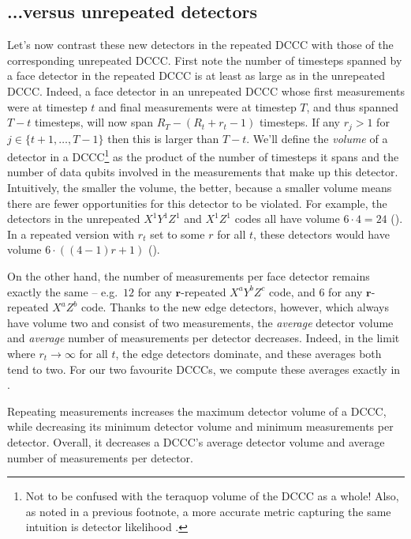 \subsection{...versus unrepeated detectors}\label{subsubsec:repeating_measurements_volume_measurements_detectors}

Let's now contrast these new detectors in the repeated DCCC with those of the corresponding unrepeated DCCC.
First note the number of timesteps spanned by a face detector in the repeated DCCC is at least as large as in the unrepeated DCCC.
Indeed, a face detector in an unrepeated DCCC whose first measurements were at timestep $t$ and final measurements were at timestep $T$, and thus spanned $T - t$ timesteps, will now span $R_T - (R_t + r_t - 1)$ timesteps.
If any $r_j > 1$ for $j \in \{t+1, \ldots, T-1\}$ then this is larger than $T-t$.
We'll define the \textit{volume} of a detector in a DCCC\footnote{Not to be confused with the teraquop volume of the DCCC as a whole! Also, as noted in a previous footnote, a more accurate metric capturing the same intuition is detector likelihood \cite{hesner2024using}.} as the product of the number of timesteps it spans and the number of data qubits involved in the measurements that make up this detector.
Intuitively, the smaller the volume, the better, because a smaller volume means there are fewer opportunities for this detector to be violated.
For example, the detectors in the unrepeated $X^1 Y^1 Z^1$ and $X^1 Z^1$ codes all have volume $6 \cdot 4 = 24$ ().
In a repeated version with $r_t$ set to some $r$ for all $t$, these detectors would have volume $6 \cdot ((4-1)r + 1)$ ().

On the other hand, the number of measurements per face detector remains exactly the same -- e.g.\ $12$ for any $\mathbf{r}$-repeated $X^a Y^b Z^c$ code, and 6 for any $\mathbf{r}$-repeated $X^a Z^b$ code.
Thanks to the new edge detectors, however, which always have volume two and consist of two measurements, the \emph{average} detector volume and \emph{average} number of measurements per detector decreases.
Indeed, in the limit where $r_t \to \infty$ for all $t$, the edge detectors dominate, and these averages both tend to two.
For our two favourite DCCCs, we compute these averages exactly in .

\begin{difference}\label{dif:repeating_detectors}
Repeating measurements increases the maximum detector volume of a DCCC,
while decreasing its minimum detector volume and minimum measurements per detector.
Overall, it decreases a DCCC's average detector volume and average number of measurements per detector.
\end{difference}

